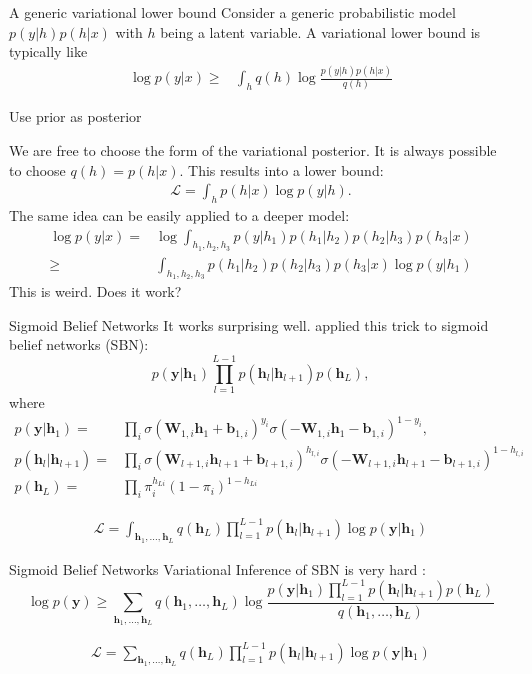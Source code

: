 \documentclass[14pt,aspectratio=1610]{beamer}
\newcommand{\yV}{\mathbf{y}}
\newcommand{\bound}{\mathcal{L}}
\newcommand{\hV}{\mathbf{h}}
\newcommand{\bV}{\mathbf{b}}
\newcommand{\wM}{\mathbf{W}}
\begin{document}
\begin{frame}{A generic variational lower bound}
Consider a generic probabilistic model $p(y| h) p(h |x)$ with $h$ being a latent variable. A variational lower bound is typically like
\begin{align*}
\log p(y | x) \geq& \int_{h} q(h) \log \frac{p(y| h) p(h |x)}{q(h)}
\end{align*}
\end{frame}

\begin{frame}{Use prior as posterior}

We are free to choose the form of the variational posterior. It is always possible to choose $q(h) = p(h|x)$.
This results into a lower bound:
\begin{align*}
\bound = \int_h p(h|x) \log p(y|h).
\end{align*}
The same idea can be easily applied to a deeper model:
\begin{align*}
\log p(y | x) =& \log \int_{h_1, h_2, h_3} p(y| h_1) p(h_1|h_2) p(h_2 | h_3) p(h_3 |x ) \\
\geq& \int_{h_1, h_2, h_3} p(h_1|h_2) p(h_2 | h_3) p(h_3 |x ) \log p(y|h_1)
\end{align*}
This is weird. Does it work?
\end{frame}

\begin{frame}{Sigmoid Belief Networks}
It works surprising well. \cite{DaiLawrence2015} applied this trick to sigmoid belief networks (SBN):
\[
p(\yV|\hV_{1}) \prod_{l=1}^{L-1} p(\hV_{l}|\hV_{l+1}) p(\hV_L),
\]
where
\begin{align*}
p(\yV|\hV_{1}) =& \prod_i \sigma(\wM_{1,i}\hV_{1}+\bV_{1,i})^{y_i}\sigma(-\wM_{1,i}\hV_{1}-\bV_{1,i})^{1-y_i},\\ 
 p(\hV_l|\hV_{l+1}) =& \prod_i \sigma(\wM_{l+1,i}\hV_{l+1}+\bV_{l+1,i})^{h_{l,i}}\sigma(-\wM_{l+1,i}\hV_{l+1}-\bV_{l+1,i})^{1-h_{l,i}}\\
 p(\hV_L) =& \prod_{i} \pi_i^{h_{Li}}(1-\pi_i)^{1-h_{Li}}
\end{align*}

\begin{align*}
\bound = \int_{\hV_1, \ldots, \hV_L} q(\hV_L) \prod_{l=1}^{L-1} p(\hV_l|\hV_{l+1}) \log p(\yV|\hV_1)
\end{align*}
\end{frame}

\begin{frame}{Sigmoid Belief Networks}
Variational Inference of SBN is very hard \citep{MnihGregor2014}:
\[
\log p(\yV) \geq \sum_{\hV_1, \ldots, \hV_L} q(\hV_1, \ldots, \hV_L) \log \frac{p(\yV|\hV_{1}) \prod_{l=1}^{L-1} p(\hV_{l}|\hV_{l+1}) p(\hV_L)}{q(\hV_1, \ldots, \hV_L)}
\]

\begin{align*}
\bound = \sum_{\hV_1, \ldots, \hV_L} q(\hV_L) \prod_{l=1}^{L-1} p(\hV_l|\hV_{l+1}) \log p(\yV|\hV_1)
\end{align*}
\end{frame}
\end{document}
